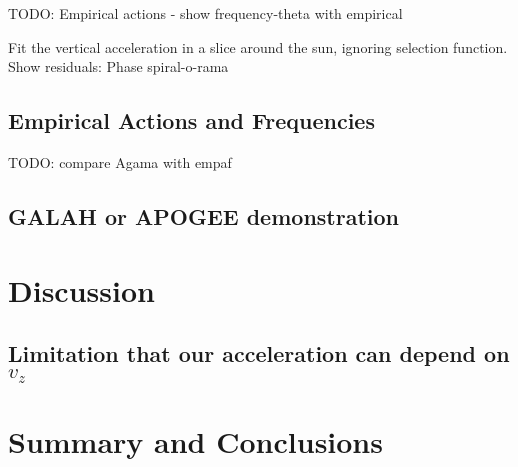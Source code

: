 TODO: Empirical actions - show frequency-theta with empirical

Fit the vertical acceleration in a slice around the sun, ignoring selection function.
Show residuals: Phase spiral-o-rama


\subsection{Empirical Actions and Frequencies}
\label{sec:gaiadr3}

TODO: compare Agama with empaf


\subsection{GALAH or APOGEE demonstration}
\label{sec:gaiadr3}


\section{Discussion} \label{sec:discussion}

\subsection{Limitation that our acceleration can depend on $v_z$}


\section{Summary and Conclusions} \label{sec:conclusions}


